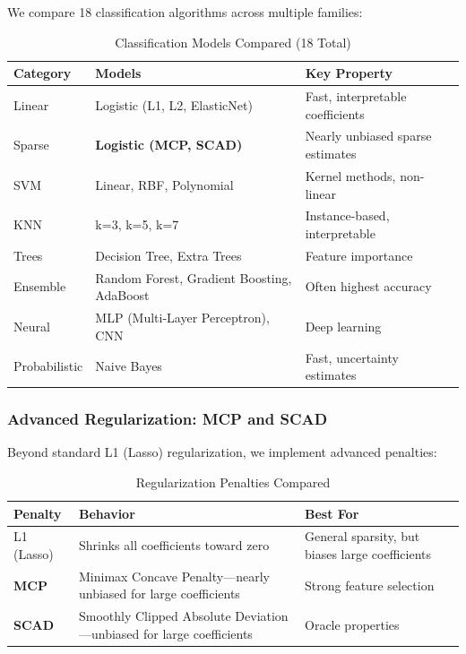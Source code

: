 \documentclass[11pt,a4paper]{article}
\begin{document}
We compare 18 classification algorithms across multiple families:

\begin{table}[H]
\centering
\caption{Classification Models Compared (18 Total)}
\begin{tabular}{p{2.5cm}p{5.5cm}p{4.5cm}}
\toprule
\textbf{Category} & \textbf{Models} & \textbf{Key Property} \\
\midrule
Linear & Logistic (L1, L2, ElasticNet) & Fast, interpretable coefficients \\
Sparse & \textbf{Logistic (MCP, SCAD)} & Nearly unbiased sparse estimates \\
SVM & Linear, RBF, Polynomial & Kernel methods, non-linear \\
KNN & k=3, k=5, k=7 & Instance-based, interpretable \\
Trees & Decision Tree, Extra Trees & Feature importance \\
Ensemble & Random Forest, Gradient Boosting, AdaBoost & Often highest accuracy \\
Neural & MLP (Multi-Layer Perceptron), CNN & Deep learning \\
Probabilistic & Naive Bayes & Fast, uncertainty estimates \\
\bottomrule
\end{tabular}
\end{table}

\subsubsection{Advanced Regularization: MCP and SCAD}

Beyond standard L1 (Lasso) regularization, we implement advanced penalties:

\begin{table}[H]
\centering
\caption{Regularization Penalties Compared}
\begin{tabular}{p{2.5cm}p{5cm}p{5cm}}
\toprule
\textbf{Penalty} & \textbf{Behavior} & \textbf{Best For} \\
\midrule
L1 (Lasso) & Shrinks all coefficients toward zero & General sparsity, but biases large coefficients \\
\textbf{MCP} & Minimax Concave Penalty---nearly unbiased for large coefficients & Strong feature selection \\
\textbf{SCAD} & Smoothly Clipped Absolute Deviation---unbiased for large coefficients & Oracle properties \\
\bottomrule
\end{tabular}
\end{table}
\end{document}
